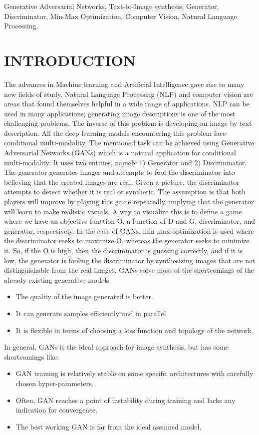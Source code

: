 \documentclass[conference]{IEEEtran}
\begin{document}
	\begin{IEEEkeywords}
		Generative Adversarial Networks, Text-to-Image synthesis, Generator, Discriminator, Min-Max Optimization, Computer Vision, Natural Language Processing.
	\end{IEEEkeywords}
	
	\section{INTRODUCTION}
	
	The advances in Machine learning and Artificial Intelligence gave rise to many new fields of study. Natural Language Processing (NLP) and computer vision are areas that found themselves helpful in a wide range of applications. NLP can be used in many applications; generating image descriptions is one of the most challenging problems. The inverse of this problem is developing an image by text description. All the deep learning models encountering this problem face conditional multi-modality, The mentioned task can be achieved using  Generative Adversarial Networks (GANs) which is a natural application for conditional multi-modality. It uses two entities, namely 1) Generator and 2) Discriminator. The generator generates images and attempts to fool the discriminator into believing that the created images are real. Given a picture, the discriminator attempts to detect whether it is real or synthetic. The assumption is that both players will improve by playing this game repeatedly, implying that the generator will learn to make realistic visuals. A way to visualize this is to define a game where we have an objective function O, a function of D and G, discriminator, and generator, respectively.  In the case of GANs, min-max optimization is used where the discriminator seeks to maximize O, whereas the generator seeks to minimize it. So, if the O is high, then the discriminator is guessing correctly, and if it is low, the generator is fooling the discriminator by synthesizing images that are not distinguishable from the real images. GANs solve most of the shortcomings of the already existing generative models:
	\begin{itemize}
		\item The quality of the image generated is better.
		\item It can generate samples efficiently and in parallel
		\item It is flexible in terms of choosing a loss function and topology of the network.
	\end{itemize}
	In general, GANs is the ideal approach for image synthesis, but has some shortcomings like:
	\begin{itemize}
		\item GAN training is relatively stable on some specific architectures with carefully chosen hyper-parameters.
		\item Often, GAN reaches a point of instability during training and lacks any indication for convergence.
		\item The best working GAN is far from the ideal assumed model.
	\end{itemize}
	
\end{document}
